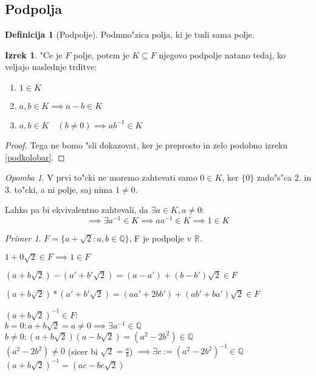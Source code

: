 \documentclass[11pt, a4paper]{article}
\theoremstyle{definition}
\newtheorem{defn}[counter]{Definicija}
\newtheorem{theorem}[counter]{Izrek}
\theoremstyle{remark}
\newtheorem*{ex}{Primer}
\newtheorem*{rem}{Opomba}
\newcommand{\Q}{\mathbb{Q}}
\newcommand{\R}{\mathbb{R}}
\begin{document}
	\subsection{Podpolja}
	\begin{defn}[Podpolje]
		Podmno"zica polja, ki je tudi sama polje.
	\end{defn}
	\begin{theorem}
		"Ce je $F$ polje, potem je $K \subseteq F$ njegovo podpolje natano tedaj, ko veljajo naslednje trditve:
		\begin{enumerate}
			\item $1 \in K$
			\item $a, b \in K \implies a-b \in K$
			\item $a,b \in K \quad (b \neq 0) \implies ab^{-1} \in K$
		\end{enumerate}
	\end{theorem}
	\begin{proof}
		Tega ne bomo "sli dokazovat, ker je preprosto in zelo podobno izreku \ref{podkolobar}.
	\end{proof}
	\begin{rem}
		V prvi to"cki ne moremo zahtevati samo $0 \in K$, ker $\lbrace 0 \rbrace$ zado"s"ca 2. in 3. to"cki, a ni polje, saj nima $1 \neq 0$.
		
		Lahko pa bi ekvivalentno zahtevali, da $\exists a \in K, a \neq 0$:
		\[ \implies \exists a^{-1} \in K \implies aa^{-1} \in K \implies 1 \in K \]
	\end{rem}

	\begin{ex}
		$F = \lbrace a + \sqrt{2}: a,b \in \Q \rbrace$,
		F je podpolje v $\R$.
		
		$ 1 + 0 \sqrt{2} \in F \implies 1 \in F $
		
		$ (a + b \sqrt{2}) - (a' + b'\sqrt{2}) = (a-a') + (b-b')\sqrt{2} \in F $
		
		$ (a + b \sqrt{2}) * (a' + b'\sqrt{2}) = (aa' + 2bb') + (ab'  + ba')\sqrt{2} \in F$
		
		$ (a + b \sqrt{2})^{-1} \in F $:\\
		$b = 0: a + b\sqrt{2} = a \neq 0 \implies \exists a^{-1} \in \Q$\\
		$b \neq 0: (a + b\sqrt{2})(a - b\sqrt{2}) = (a^2 - 2b^2) \in \Q $\\
		$(a^2 - 2b^2) \neq 0 $ (sicer bi $\sqrt{2} = \frac{a}{b}$) $\implies \exists c:=(a^2 - 2b^2)^{-1} \in \Q$\\
		$(a + b\sqrt{2})^{-1} = (ac - bc\sqrt{2})$
	\end{ex}
	
\end{document}
